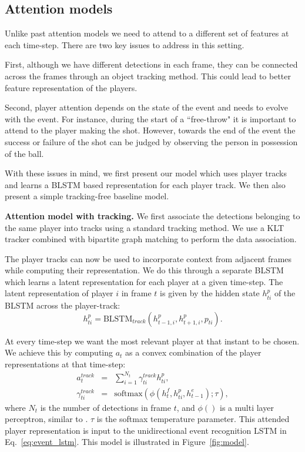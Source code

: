 \subsection{Attention models}
Unlike past attention models \cite{Bahdnau_arxiv14,Xu_arxiv15,Yao_arxiv15} we need to attend to a different set of
features at each time-step. There are two key issues to address in this
setting.

First, although we have different detections in each frame, they
can be connected across the frames through an object tracking
method. This could lead to better feature representation of the
players.

Second, player attention depends on the state of the event and needs to evolve
with the event.  For instance, during the start of a ``free-throw" it is
important to attend to the player making the shot. However, towards the end of
the event the success or failure of the shot can be judged by observing the
person in possession of the ball.

With these issues in mind, we first present our model which uses player tracks
and learns a BLSTM based representation for each player track. We then
also
present a simple tracking-free baseline model.

\noindent \textbf{Attention model with tracking.}
We first associate the detections
belonging to the same player into tracks using a standard
tracking method. We use a KLT tracker combined with
bipartite graph matching \cite{munkres1957algorithms} to perform the data association.

The player tracks can now be used to incorporate context
from adjacent frames while computing their representation.
We do this through a separate BLSTM which learns a latent
representation for each player at a given time-step.
The latent representation of player $i$ in frame $t$ is
given by the hidden state
$h_{ti}^p$ of the BLSTM across the player-track:
\[
  h_{ti}^p = \mbox{BLSTM}_{track}(h_{t-1,i}^p, h_{t+1,i}^p, p_{ti}).
\]

At every time-step we want the most relevant player at that
instant to be chosen. We achieve this by computing
$a_t$ as a convex combination of the player representations
at that time-step:
\begin{eqnarray} 
\label{eq:track}
  a_t^{track} & = & \sum_{i=1}^{N_t} \gamma_{ti}^{track} h_{ti}^p, \\ \nonumber
  \gamma_{ti}^{track} & = & \text{softmax} \left(\phi\left(h^f_t, h^p_{ti}, h^e_{t-1}\right); \tau\right),
\end{eqnarray}where $N_t$ is the number of detections in frame $t$, and $\phi()$ is a 
multi layer perceptron, similar to \cite{Bahdnau_arxiv14}. $\tau$ is the softmax temperature parameter.
This attended player representation is input to the
unidirectional event recognition LSTM in Eq.~\ref{eq:event_lstm}.
This model is illustrated in Figure~\ref{fig:model}.

